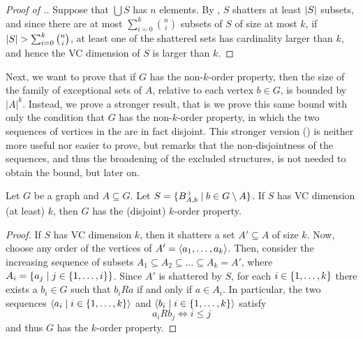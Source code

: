         \begin{proof}[Proof of .]
            Suppose that $\bigcup S$ has $n$ elements.
            By , $S$ shatters at least $| S |$ subsets, and since there are at most
            $\sum_{i=0}^k \binom{n}{i}$ subsets of $S$ of size at most $k$, if
            $| S | > \sum_{i=0}^k \binom{n}{i}$, at least one of the shattered sets has cardinality larger than $k$,
            and hence the VC dimension of $S$ is larger than $k$.
        \end{proof}

        Next, we want to prove that if $G$ has the non-$k$-order property, then the size of the family of exceptional
        sets of $A$, relative to each vertex $b \in G$, is bounded by $|A|^k$.
        Instead, we prove a stronger result, that is we prove this same bound with only the condition that $G$
        has the  non-$k$-order property, in which the two sequences of vertices in the 
        are in fact disjoint.
        This stronger version () is neither more useful nor easier to prove,
        but remarks that the non-disjointness of the sequences, and thus the broadening of the excluded structures,
        is not needed to obtain the bound, but later on.

        \begin{lemma} \label{lem:vc_dimension_implies_k_order_property}
            Let $G$ be a graph and $A \subseteq G$.
            Let $S = \{ B^+_{A,b} \mid b \in G \setminus A \}$.
            If $S$ has VC dimension (at least) $k$, then $G$ has the (disjoint)
            $k$-order property.
            \begin{proof}
                If $S$ has VC dimension $k$, then it shatters a set $A' \subseteq A$ of size $k$.
                Now, choose any order of the vertices of $A' = \left< a_1, \dots, a_k \right>$.
                Then, consider the increasing sequence of subsets $A_1 \subseteq A_2 \subseteq \dots \subseteq A_k = A'$,
                where $A_i = \{ a_j \mid j \in \{ 1, \dots, i \} \}$.
                Since $A'$ is shattered by $S$, for each $i \in \{ 1, \dots, k \}$ there exists a $b_i \in G$ such that
                $b_i R a$ if and only if $a \in A_i$.
                In particular, the two sequences $\left< a_i \mid i \in \{ 1, \dots, k \} \right>$ and
                $\left< b_i \mid i \in \{ 1, \dots, k \} \right>$ satisfy
                \[
                    a_i R b_j \Leftrightarrow i \leq j
                \]
                and thus $G$ has the $k$-order property.
            \end{proof}
        \end{lemma}

